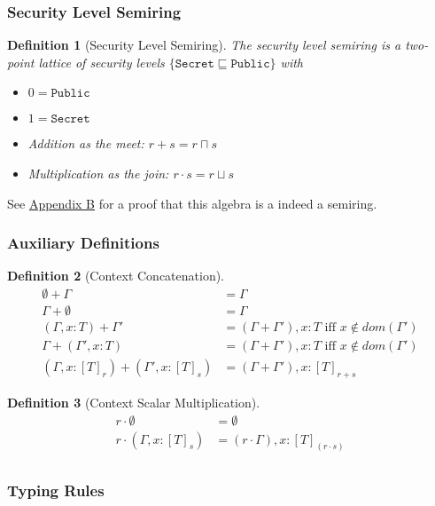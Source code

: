 \documentclass[conference]{IEEEtran}
\newcommand\public{\texttt{Public}}
\newcommand\secret{\texttt{Secret}}
\newtheorem{definition}{Definition}
\begin{document}
\subsubsection{Security Level Semiring}

\begin{definition}[Security Level Semiring]
The security level semiring is a two-point lattice of security levels $\{\secret\sqsubseteq\public\}$ with 
\begin{itemize}
	\item $0=\public$
	\item $1=\secret$
	\item Addition as the meet: $r+s=r\sqcap s$
	\item Multiplication as the join: $r\cdot s=r\sqcup s$
\end{itemize}
\end{definition}
See \hyperref[app-b]{Appendix B} for a proof that this algebra is a indeed a semiring.

\subsubsection{Auxiliary Definitions}
\label{def-concat}
\begin{definition}[Context Concatenation]
    $$
    \begin{aligned}
        \emptyset+\Gamma&=\Gamma\\
        \Gamma+\emptyset&=\Gamma\\
        (\Gamma,x:T)+\Gamma'&=(\Gamma+\Gamma'),x:T\text{ iff }x\notin dom(\Gamma')\\
        \Gamma+(\Gamma',x:T)&=(\Gamma+\Gamma'),x:T\text{ iff }x\notin dom(\Gamma')\\
        (\Gamma,x:[T]_r)+(\Gamma',x:[T]_s)&=(\Gamma+\Gamma'),x:[T]_{r+s}
    \end{aligned}
    $$
\end{definition}
\label{def-mul}
\begin{definition}[Context Scalar Multiplication]
    $$
    \begin{aligned}
    r\cdot\emptyset&=\emptyset\\
    r\cdot(\Gamma,x:[T]_s)&=(r\cdot\Gamma),x:[T]_{(r\cdot s)}\\
    \end{aligned}
    $$
\end{definition}

\subsubsection{Typing Rules}
\end{document}
